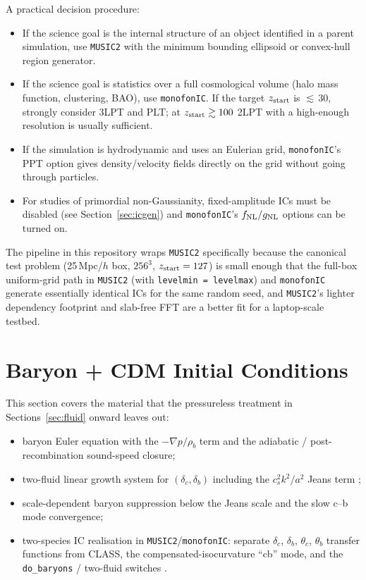 \documentclass[12pt]{article}
\begin{document}
\noindent
A practical decision procedure:
\begin{itemize}
  \item If the science goal is the internal structure of an object
        identified in a parent simulation, use \texttt{MUSIC2} with
        the minimum bounding ellipsoid or convex-hull region
        generator.
  \item If the science goal is statistics over a full cosmological
        volume (halo mass function, clustering, BAO), use
        \texttt{monofonIC}.  If the target $z_{\rm start}$ is
        ${\lesssim}\,30$, strongly consider 3LPT and PLT; at
        $z_{\rm start} \gtrsim 100$ 2LPT with a high-enough resolution
        is usually sufficient.
  \item If the simulation is hydrodynamic and uses an Eulerian grid,
        \texttt{monofonIC}'s PPT option gives density/velocity fields
        directly on the grid without going through particles.
  \item For studies of primordial non-Gaussianity, fixed-amplitude
        ICs must be disabled (see Section~\ref{sec:icgen}) and
        \texttt{monofonIC}'s $f_{\rm NL}/g_{\rm NL}$ options can be
        turned on.
\end{itemize}

The pipeline in this repository wraps \texttt{MUSIC2} specifically
because the canonical test problem (25\,Mpc/$h$ box, $256^3$,
$z_{\rm start}=127$) is small enough that the full-box uniform-grid
path in \texttt{MUSIC2} (with \texttt{levelmin = levelmax}) and
\texttt{monofonIC} generate essentially identical ICs for the same
random seed, and \texttt{MUSIC2}'s lighter dependency footprint and
slab-free FFT are a better fit for a laptop-scale testbed.

\section{Baryon + CDM Initial Conditions}
\label{sec:baryons_cdm}

This section covers the material that the pressureless treatment in
Sections~\ref{sec:fluid} onward leaves out:
%
\begin{itemize}
  \item baryon Euler equation with the $-\nabla p/\rho_b$ term and the
        adiabatic / post-recombination sound-speed closure;
  \item two-fluid linear growth system for $(\delta_c,\delta_b)$
        including the $c_s^2 k^2/a^2$ Jeans term \citep{ShojiKomatsu2009,
        Somogyi2010};
  \item scale-dependent baryon suppression below the Jeans scale and
        the slow c--b mode convergence;
  \item two-species IC realisation in \texttt{MUSIC2}/\texttt{monofonIC}:
        separate $\delta_c$, $\delta_b$, $\theta_c$, $\theta_b$ transfer
        functions from CLASS, the compensated-isocurvature ``cb'' mode,
        and the \texttt{do\_baryons} / two-fluid switches
        \citep{HahnRampfUhlemann2021}.
\end{itemize}
\end{document}
